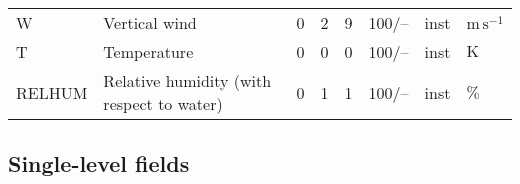 \begin{table}[H]
\begin{tabular}{p{2.0cm}p{5.0cm}p{0.7cm}p{0.7cm}p{0.7cm}p{1.4cm}p{1cm}p{1cm}}
W                          &  Vertical wind                                                                             &               0                                   &                     2                       &                    9                       &                 100/--                          &                      inst                   &        $\mathrm{m\,s^{-1}}$   \\
T                          &  Temperature                                                                               &               0                                   &                     0                       &                    0                       &                 100/--                          &                      inst                   &        $\mathrm{K}$          \\
RELHUM                     &  Relative humidity (with respect to water)                                                 &               0                                   &                     1                       &                    1                       &                 100/--                          &                      inst                   &        $\mathrm{\%}$ \\
  \bottomrule
 \end{tabular}
\end{table}




\subsection{Single-level fields}


